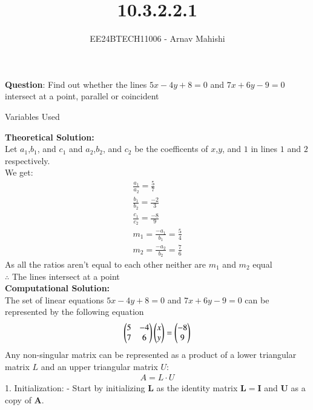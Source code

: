 \documentclass[journal]{IEEEtran}
\begin{document}

\vspace{3cm}

\title{10.3.2.2.1}
\author{EE24BTECH11006 - Arnav Mahishi}
{\let\newpage\relax\maketitle}

\renewcommand{\thefigure}{\theenumi}
\renewcommand{\thetable}{\theenumi}
\setlength{\intextsep}{10pt} %


\renewcommand{\thetable}{\theenumi}


\textbf{Question}:\newline
Find out whether the lines $5x-4y+8=0$ and $7x+6y-9=0$ intersect at a point, parallel or coincident 
\newline
\begin{table}[h!]    
  \centering
  
  \caption{Variables Used}
  \label{tab1.1.2.2}
\end{table}
\newline
\textbf{Theoretical Solution:}\\
Let $a_1$,$b_1$, and $c_1$ and $a_2$,$b_2$, and $c_2$ be the coefficents of $x$,$y$, and $1$ in lines $1$ and $2$ respectively.\\
We get:
\begin{align}
    \frac{a_1}{a_2}=\frac{5}{7}\\
    \frac{b_1}{b_2}=\frac{-2}{3}\\
    \frac{c_1}{c_2}=\frac{-8}{9}\\
    m_1=\frac{-a_1}{b_1}=\frac{5}{4}\\
    m_2=\frac{-a_2}{b_2}=\frac{7}{6}
\end{align}
As all the ratios aren't equal to each other neither are $m_1$ and $m_2$ equal\\
$\therefore$ The lines intersect at a point\\
\textbf{Computational Solution:}\\
The set of linear equations $5x-4y+8=0$ and $7x+6y-9=0$ can be represented by the following equation
\begin{align}
    \begin{pmatrix}5&-4\\7&6\end{pmatrix}\begin{pmatrix}x\\y\end{pmatrix}=\begin{pmatrix}-8\\9\end{pmatrix}
\end{align}
Any non-singular matrix can be represented as a product of a lower triangular matrix $L$ and an
upper triangular matrix $U$:
\begin{align}
    A = L \cdot U
\end{align}
1. Initialization: 
   - Start by initializing $ \mathbf{L} $ as the identity matrix $ \mathbf{L} = \mathbf{I} $ and $ \mathbf{U} $ as a copy of $ \mathbf{A} $.
   
\end{document}

